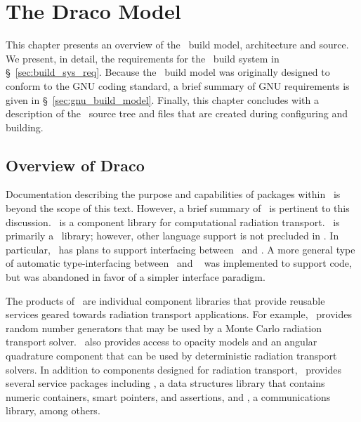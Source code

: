 
\chapter{The Draco Model}
\label{chap:model}

This chapter presents an overview of the \draco\ build model, architecture and
source.  We present, in detail, the requirements for the \draco\ build
system in \S~\ref{sec:build_sys_req}.  Because the \draco\ build model
was originally designed to conform to the GNU coding standard, a brief
summary of GNU requirements is given in \S~\ref{sec:gnu_build_model}.
Finally, this chapter concludes with a description of the \draco\ 
source tree and files that are created during configuring and
building.


\section{Overview of Draco}
\label{sec:overview_of_draco}

Documentation describing the purpose and capabilities of packages
within \draco\ is beyond the scope of this text.  However, a brief
summary of \draco\ is pertinent to this discussion.  \draco\ is a
component library for computational radiation transport.  \draco\ is
primarily a \cpp\ library; however, other language support is not
precluded in \draco.  In particular, \draco\ has plans to support  interfacing between \cpp\ and \fortran.  A more general type of 
automatic type-interfacing between \cpp\ and \fortran~\cite{gr99} was implemented to support \sys{Dante} code, but was abandoned in favor of a simpler interface paradigm.

The products of \draco\ are individual component libraries
that provide reusable services geared towards radiation transport
applications.  For example, \draco\ provides random number generators that may be used by a Monte
Carlo radiation transport solver.  \draco\ also provides access to opacity models and an angular quadrature component that can be used by deterministic radiation transport solvers.  In addition to components designed for radiation transport,
\draco\ provides several service packages including \dsxx, a data
structures library that contains numeric containers, smart pointers,
and assertions, and \cfour, a communications library, among others.


